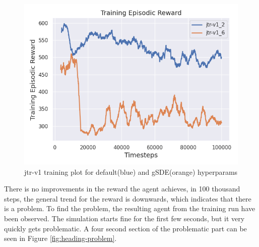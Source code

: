 \documentclass[12pt,twoside]{report}
\begin{document}
\begin{figure}[htbp]
\centering
\includegraphics[width = 0.65\hsize]{figures/rl-reward-plots/jtr-v1 100k.png}
\caption{jtr-v1 training plot for default(blue) and gSDE(orange) hyperparams}
\label{fig:jtr-v1}
\end{figure}

There is no improvements in the reward the agent achieves, in 100 thousand steps, the general trend for the reward is downwards, which indicates that there is a problem. To find the problem, the resulting agent from the training run have been observed. The simulation starts fine for the first few seconds, but it very quickly gets problematic. A four second section of the problematic part can be seen in Figure \ref{fig:heading-problem}. 
\end{document}
